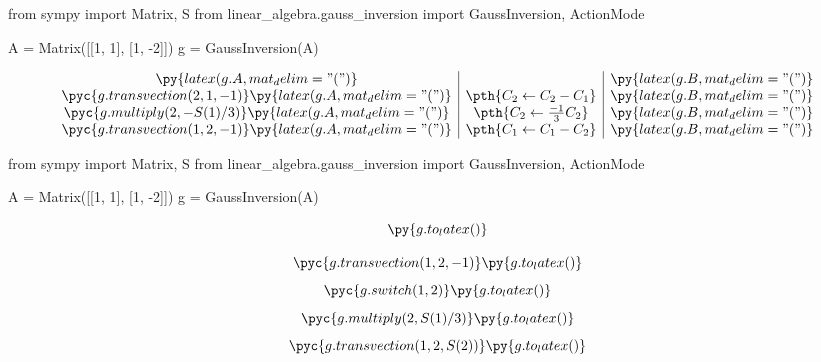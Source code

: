     \begin{latexcode}
\begin{pycode}
from sympy import Matrix, S
from linear_algebra.gauss_inversion import GaussInversion, ActionMode

A = Matrix([[1, 1], [1, -2]])
g = GaussInversion(A)
\end{pycode}
        $$\begin{array}{c|c|c}
            \py{latex(g.A, mat_delim="(")} & & \py{latex(g.B, mat_delim="(")} \\
            \pyc{g.transvection(2, 1, -1)}\py{latex(g.A, mat_delim="(")} & \pth{C_{2}\leftarrow C_{2} - C_{1}} & \py{latex(g.B, mat_delim="(")} \\
            \pyc{g.multiply(2, -S(1)/3)}\py{latex(g.A, mat_delim="(")} & \pth{C_{2}\leftarrow \frac{-1}{3}C_{2}} & \py{latex(g.B, mat_delim="(")} \\
            \pyc{g.transvection(1, 2, -1)}\py{latex(g.A, mat_delim="(")} & \pth{C_{1}\leftarrow C_{1} - C_{2}} & \py{latex(g.B, mat_delim="(")}
        \end{array}$$
    \end{latexcode}

    \begin{latexcode}
\begin{pycode}
from sympy import Matrix, S
from linear_algebra.gauss_inversion import GaussInversion, ActionMode

A = Matrix([[1, 1], [1, -2]])
g = GaussInversion(A)
\end{pycode}
        $$\py{g.to_latex()}$$

        $$\pyc{g.transvection(1, 2, -1)}\py{g.to_latex()}$$
        $$\pyc{g.switch(1, 2)}\py{g.to_latex()}$$
        $$\pyc{g.multiply(2, S(1)/3)}\py{g.to_latex()}$$
        $$\pyc{g.transvection(1, 2, S(2))}\py{g.to_latex()}$$
    \end{latexcode}
